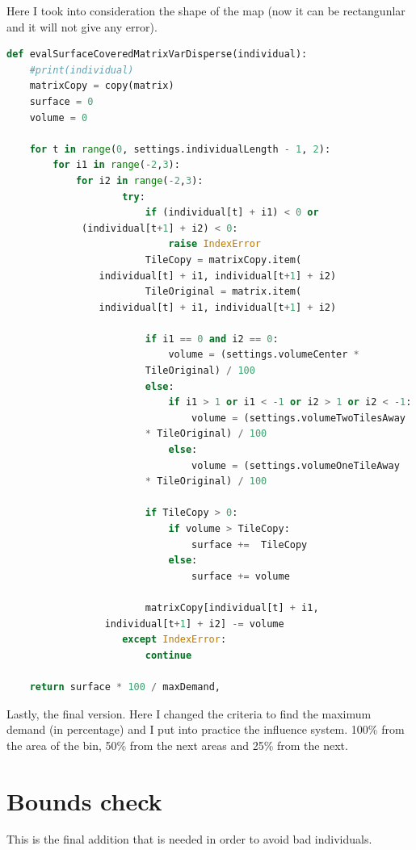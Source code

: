\documentclass[a4paper,12pt]{report}
\begin{document}
Here I took into consideration the shape of the map (now it can be rectangunlar and it will not give any error).

\begin{lstlisting}[language=Python]
def evalSurfaceCoveredMatrixVarDisperse(individual):
    #print(individual)
    matrixCopy = copy(matrix)
    surface = 0
    volume = 0
    
    for t in range(0, settings.individualLength - 1, 2):
        for i1 in range(-2,3):
            for i2 in range(-2,3):
                    try:
                        if (individual[t] + i1) < 0 or
			 (individual[t+1] + i2) < 0:
                            raise IndexError
                        TileCopy = matrixCopy.item(
				individual[t] + i1, individual[t+1] + i2)
                        TileOriginal = matrix.item(
				individual[t] + i1, individual[t+1] + i2)
                        
                        if i1 == 0 and i2 == 0:
                            volume = (settings.volumeCenter * 
						TileOriginal) / 100
                        else:
                            if i1 > 1 or i1 < -1 or i2 > 1 or i2 < -1:
                                volume = (settings.volumeTwoTilesAway
						* TileOriginal) / 100
                            else:
                                volume = (settings.volumeOneTileAway 
						* TileOriginal) / 100
                        
                        if TileCopy > 0:       
                            if volume > TileCopy:
                                surface +=  TileCopy
                            else:
                                surface += volume
                        
                        matrixCopy[individual[t] + i1,
				 individual[t+1] + i2] -= volume
                    except IndexError:
                        continue 
    
    return surface * 100 / maxDemand,
\end{lstlisting}

Lastly, the final version. Here I changed the criteria to find the maximum demand (in percentage) and I put into practice the influence system. 100\% from the area of the bin, 50\% from the next areas and 25\% from the next.

\section {Bounds check}
This is the final addition that is needed in order to avoid bad individuals.
\end{document}

